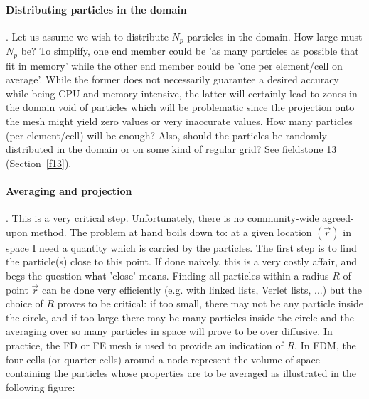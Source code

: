\paragraph{Distributing particles in the domain}. Let us assume we wish to distribute $N_p$ particles
in the domain. How large must $N_p$ be? To simplify, one end member could be 'as many particles as possible that fit in memory' 
while the other end member could be 'one per element/cell on average'. While the former does not necessarily guarantee a 
desired accuracy while being CPU and memory intensive, the latter will certainly lead to zones in the domain void 
of particles which will be problematic since the projection onto the mesh might yield zero values or very inaccurate values.
How many particles (per element/cell) will be enough?
Also, should the particles be randomly distributed in the domain or on some kind of regular grid? 
See fieldstone 13 (Section~\ref{f13}).

\paragraph{Averaging and projection}. This is a very critical step. Unfortunately, there is no community-wide
agreed-upon method. The problem at hand boils down to: at a given location $(\vec r)$ in space I need a 
quantity which is carried by the particles. 
The first step is to find the particle(s) close to this point. If done naively, this is a very costly affair, 
and begs the question what 'close' means. Finding all particles within a radius $R$ of point $\vec r$ can 
be done very efficiently (e.g. with linked lists, Verlet lists, ...) but the choice of $R$ proves to be critical:
if too small, there may not be any particle inside the circle, and if too large there may be many particles 
inside the circle and the averaging over so many particles in space will prove to be over diffusive. 
In practice, the FD or FE mesh is used to provide an indication of $R$. In FDM, the four cells (or quarter cells) around
a node represent the volume of space containing the particles whose properties are to be averaged \cite{dumg11} 
as illustrated in the following figure:

